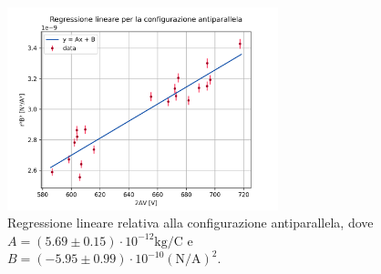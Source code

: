 \documentclass[]{article}
\begin{document}
\begin{figure}[h]
    \centering
    \includegraphics[width=0.70\textwidth]{plot/graph_apar.png}
    \caption{Regressione lineare relativa alla configurazione antiparallela, dove $A=(5.69 \pm 0.15) \cdot 10^{-12}\text{kg/C}$ e $B = (-5.95 \pm 0.99) \cdot 10^{-10} (\text{N/A})^2$.}
    \label{graph_par}
\end{figure}

\label{par:graph}
\end{document}
